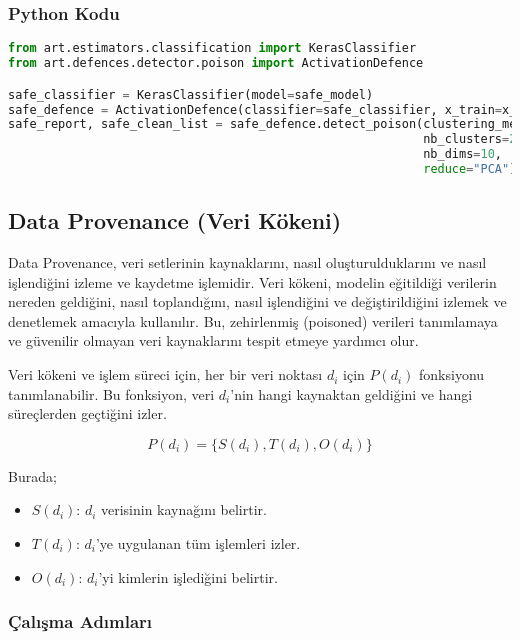 \subsubsection{Python Kodu}

\begin{lstlisting}[language=Python]
from art.estimators.classification import KerasClassifier
from art.defences.detector.poison import ActivationDefence

safe_classifier = KerasClassifier(model=safe_model)
safe_defence = ActivationDefence(classifier=safe_classifier, x_train=x_test, y_train=y_test)
safe_report, safe_clean_list = safe_defence.detect_poison(clustering_method="KMeans",
                                                          nb_clusters=2, 
                                                          nb_dims=10,
                                                          reduce="PCA")
\end{lstlisting}

\newpage

\subsection{Data Provenance (Veri Kökeni)}

Data Provenance, veri setlerinin kaynaklarını, nasıl oluşturulduklarını ve nasıl işlendiğini izleme ve kaydetme işlemidir. Veri kökeni, modelin eğitildiği verilerin nereden geldiğini, nasıl toplandığını, nasıl işlendiğini ve değiştirildiğini izlemek ve denetlemek amacıyla kullanılır. Bu, zehirlenmiş (poisoned) verileri tanımlamaya ve güvenilir olmayan veri kaynaklarını tespit etmeye yardımcı olur.

Veri kökeni ve işlem süreci için, her bir veri noktası $d_i$ için $P(d_i)$ fonksiyonu tanımlanabilir. Bu fonksiyon, veri $d_i$'nin hangi kaynaktan geldiğini ve hangi süreçlerden geçtiğini izler.

\[ P(d_i) = \{ S(d_i), T(d_i), O(d_i) \} \]

Burada;

\begin{itemize}
    \item $S(d_i)$: $d_i$ verisinin kaynağını belirtir.
    \item $T(d_i)$: $d_i$'ye uygulanan tüm işlemleri izler.
    \item $O(d_i)$: $d_i$'yi kimlerin işlediğini belirtir.
\end{itemize}

\subsubsection{Çalışma Adımları}

